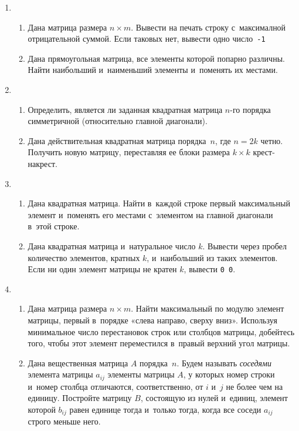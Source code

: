 \documentclass{article}
\newcommand{\textex}[1]{\texttt{\color{ForestGreen}#1}}
\begin{document}
\begin{enumerate}[label={}, leftmargin=0pt, itemindent=0pt]
\item
\begin{enumerate}[label=\arabic{enumi}.\arabic*.] %
  \item
  Дана матрица размера $n × m$. Вывести на печать строку с~максималной отрицательной суммой. Если таковых нет, вывести одно число~\textex{-1} 
  \item
  Дана прямоугольная матрица, все элементы которой попарно различны. Найти наибольший и~наименьший элементы и~поменять их местами.
\end{enumerate}

\item
\begin{enumerate}[label=\arabic{enumi}.\arabic*.] %
\item
  Определить, является ли заданная квадратная матрица $n$-го порядка симметричной (относительно главной диагонали).
  \item
  Дана действительная квадратная матрица порядка~$n$, где $n=2k$ четно. Получить новую матрицу, переставляя ее блоки размера $k\times k$ крест-накрест.
\end{enumerate}

\item
\begin{enumerate}[label=\arabic{enumi}.\arabic*.] %
\item
  Дана квадратная матрица. Найти в~каждой строке первый максимальный элемент и~поменять его местами с~элементом на главной диагонали в~этой строке.
  \item
  Дана квадратная матрица и~натуральное число $k$. Вывести через пробел количество элементов, кратных $k$, и~наибольший из таких элементов. Если ни один элемент матрицы не кратен $k$, вывести \texttt{0 0}.
\end{enumerate}

\item
\begin{enumerate}[label=\arabic{enumi}.\arabic*.] %
  \item
  Дана матрица размера $n × m$. Найти максимальный по модулю элемент матрицы, первый в~порядке «слева направо, сверху вниз». Используя минимальное число перестановок строк или столбцов матрицы, добейтесь того, чтобы этот элемент переместился в~правый верхний угол матрицы.
  \item
  Дана вещественная матрица $A$ порядка~$n$. Будем называть \emph{соседями} элемента матрицы $a_{ij}$ элементы матрицы $A$, у которых номер строки и~номер столбца отличаются, соответственно, от $i$ и~$j$ не более чем на единицу. Постройте матрицу $B$, состоящую из нулей и~единиц, элемент которой $b_{ij}$ равен единице тогда и~только тогда, когда все соседи $a_{ij}$ строго меньше него.
\end{enumerate}


\end{enumerate}
\end{document}
